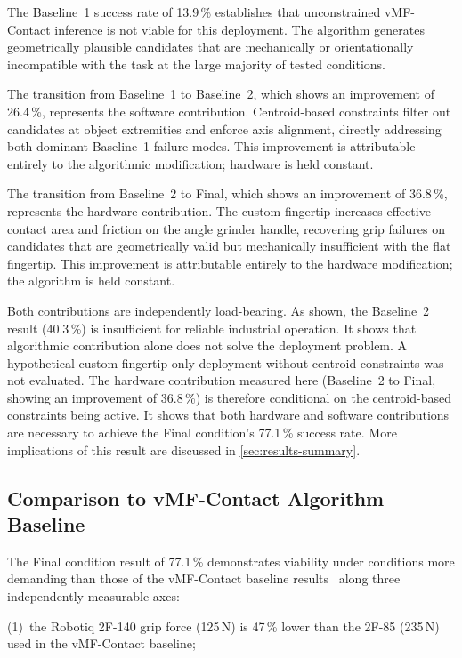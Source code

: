 \documentclass[oneside,studentpaper]{wbk}
\begin{document}
The Baseline~1 success rate of 13.9\,\% establishes that unconstrained vMF-Contact inference is not viable for this deployment. The algorithm generates geometrically plausible candidates that are mechanically or orientationally incompatible with the task at the large majority of tested conditions.

The transition from Baseline~1 to Baseline~2, which shows an improvement of 26.4\,\%, represents the software contribution. Centroid-based constraints filter out candidates at object extremities and enforce axis alignment, directly addressing both dominant Baseline~1 failure modes. This improvement is attributable entirely to the algorithmic modification; hardware is held constant.

The transition from Baseline~2 to Final, which shows an improvement of 36.8\,\%, represents the hardware contribution. The custom fingertip increases effective contact area and friction on the angle grinder handle, recovering grip failures on candidates that are geometrically valid but mechanically insufficient with the flat fingertip. This improvement is attributable entirely to the hardware modification; the algorithm is held constant.

Both contributions are independently load-bearing. As shown, the Baseline~2 result (40.3\,\%) is insufficient for reliable industrial operation. It shows that algorithmic contribution alone does not solve the deployment problem. A hypothetical custom-fingertip-only deployment without centroid constraints was not evaluated. The hardware contribution measured here (Baseline~2 to Final, showing an improvement of 36.8\,\%) is therefore conditional on the centroid-based constraints being active. It shows that both hardware and software contributions are necessary to achieve the Final condition's 77.1\,\% success rate. More implications of this result are discussed in \cref{sec:results-summary}.

\subsection{Comparison to vMF-Contact Algorithm Baseline}
\label{sec:benchmark-comparison}

The Final condition result of 77.1\,\% demonstrates viability under conditions more demanding than those of the vMF-Contact baseline results~\cite{shi2025} along three independently measurable axes:

(1)~the Robotiq 2F-140 grip force (125\,N) is 47\,\% lower than the 2F-85 (235\,N) used in the vMF-Contact baseline;
\end{document}
